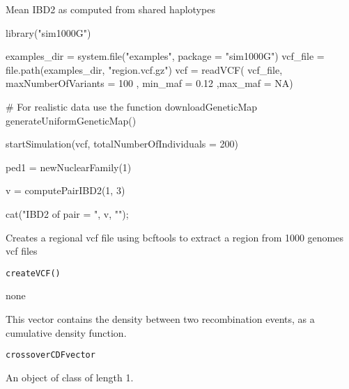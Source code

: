 \documentclass[letterpaper]{book}
\begin{document}
%
\begin{Value}
Mean IBD2 as computed from shared haplotypes
\end{Value}
%
\begin{Examples}
\begin{ExampleCode}

library("sim1000G")

examples_dir = system.file("examples", package = "sim1000G")
vcf_file = file.path(examples_dir, "region.vcf.gz")
vcf = readVCF( vcf_file, maxNumberOfVariants = 100 ,
               min_maf = 0.12 ,max_maf = NA)

# For realistic data use the function downloadGeneticMap
generateUniformGeneticMap()

startSimulation(vcf, totalNumberOfIndividuals = 200)

ped1 = newNuclearFamily(1)

v = computePairIBD2(1, 3)

cat("IBD2 of pair = ", v, "\n");

\end{ExampleCode}
\end{Examples}
%
\begin{Description}\relax
Creates a regional vcf file using bcftools to extract a region from 1000 genomes vcf files
\end{Description}
%
\begin{Usage}
\begin{verbatim}
createVCF()
\end{verbatim}
\end{Usage}
%
\begin{Value}
none
\end{Value}
%
\begin{Description}\relax
This vector contains the density between two recombination events, as a cumulative density function.
\end{Description}
%
\begin{Usage}
\begin{verbatim}
crossoverCDFvector
\end{verbatim}
\end{Usage}
%
\begin{Format}
An object of class  of length 1.
\end{Format}
\end{document}
